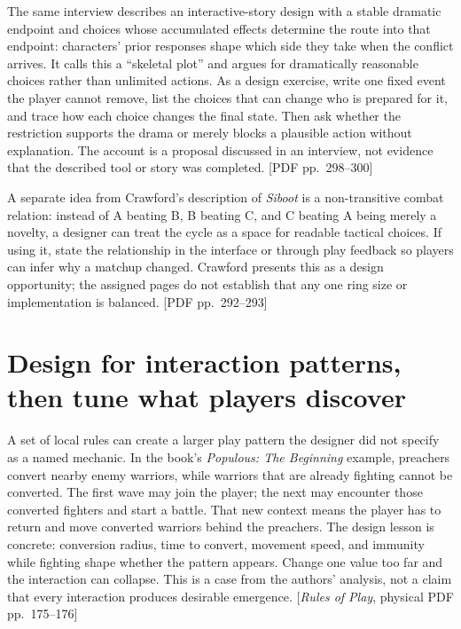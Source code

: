 The same interview describes an interactive-story design with a stable dramatic endpoint and choices whose accumulated effects determine the route into that endpoint: characters' prior responses shape which side they take when the conflict arrives. It calls this a ``skeletal plot'' and argues for dramatically reasonable choices rather than unlimited actions. As a design exercise, write one fixed event the player cannot remove, list the choices that can change who is prepared for it, and trace how each choice changes the final state. Then ask whether the restriction supports the drama or merely blocks a plausible action without explanation. The account is a proposal discussed in an interview, not evidence that the described tool or story was completed. {[}PDF pp.~298--300{]}

A separate idea from Crawford's description of \emph{Siboot} is a non-transitive combat relation: instead of A beating B, B beating C, and C beating A being merely a novelty, a designer can treat the cycle as a space for readable tactical choices. If using it, state the relationship in the interface or through play feedback so players can infer why a matchup changed. Crawford presents this as a design opportunity; the assigned pages do not establish that any one ring size or implementation is balanced. {[}PDF pp.~292--293{]}

\section{Design for interaction patterns, then tune what players discover}\label{06-engine-ii-ch047-design-for-interaction-patterns-then-tune-what-players-discover}

A set of local rules can create a larger play pattern the designer did not specify as a named mechanic. In the book's \emph{Populous: The Beginning} example, preachers convert nearby enemy warriors, while warriors that are already fighting cannot be converted. The first wave may join the player; the next may encounter those converted fighters and start a battle. That new context means the player has to return and move converted warriors behind the preachers. The design lesson is concrete: conversion radius, time to convert, movement speed, and immunity while fighting shape whether the pattern appears. Change one value too far and the interaction can collapse. This is a case from the authors' analysis, not a claim that every interaction produces desirable emergence. {[}\emph{Rules of Play}, physical PDF pp.~175--176{]}

